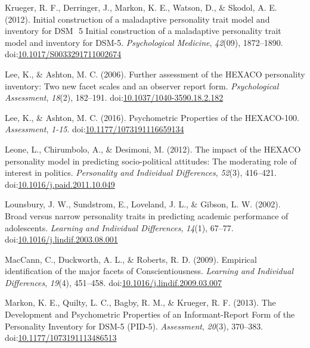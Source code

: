 \documentclass[,man,floatsintext]{apa6}
\begin{document}
\hypertarget{ref-Krueger2012a}{}
Krueger, R. F., Derringer, J., Markon, K. E., Watson, D., \& Skodol, A.
E. (2012). Initial construction of a maladaptive personality trait model
and inventory for DSM ­ 5 Initial construction of a maladaptive
personality trait model and inventory for DSM-5. \emph{Psychological
Medicine}, \emph{42}(09), 1872--1890.
doi:\href{https://doi.org/10.1017/S0033291711002674}{10.1017/S0033291711002674}

\hypertarget{ref-Lee2006}{}
Lee, K., \& Ashton, M. C. (2006). Further assessment of the HEXACO
personality inventory: Two new facet scales and an observer report form.
\emph{Psychological Assessment}, \emph{18}(2), 182--191.
doi:\href{https://doi.org/10.1037/1040-3590.18.2.182}{10.1037/1040-3590.18.2.182}

\hypertarget{ref-Lee2016}{}
Lee, K., \& Ashton, M. C. (2016). Psychometric Properties of the
HEXACO-100. \emph{Assessment}, \emph{1-15}.
doi:\href{https://doi.org/10.1177/1073191116659134}{10.1177/1073191116659134}

\hypertarget{ref-Leone2012}{}
Leone, L., Chirumbolo, A., \& Desimoni, M. (2012). The impact of the
HEXACO personality model in predicting socio-political attitudes: The
moderating role of interest in politics. \emph{Personality and
Individual Differences}, \emph{52}(3), 416--421.
doi:\href{https://doi.org/10.1016/j.paid.2011.10.049}{10.1016/j.paid.2011.10.049}

\hypertarget{ref-Lounsbury2002}{}
Lounsbury, J. W., Sundstrom, E., Loveland, J. L., \& Gibson, L. W.
(2002). Broad versus narrow personality traits in predicting academic
performance of adolescents. \emph{Learning and Individual Differences},
\emph{14}(1), 67--77.
doi:\href{https://doi.org/10.1016/j.lindif.2003.08.001}{10.1016/j.lindif.2003.08.001}

\hypertarget{ref-MacCann2009}{}
MacCann, C., Duckworth, A. L., \& Roberts, R. D. (2009). Empirical
identification of the major facets of Conscientiousness. \emph{Learning
and Individual Differences}, \emph{19}(4), 451--458.
doi:\href{https://doi.org/10.1016/j.lindif.2009.03.007}{10.1016/j.lindif.2009.03.007}

\hypertarget{ref-Markon2013}{}
Markon, K. E., Quilty, L. C., Bagby, R. M., \& Krueger, R. F. (2013).
The Development and Psychometric Properties of an Informant-Report Form
of the Personality Inventory for DSM-5 (PID-5). \emph{Assessment},
\emph{20}(3), 370--383.
doi:\href{https://doi.org/10.1177/1073191113486513}{10.1177/1073191113486513}
\end{document}
